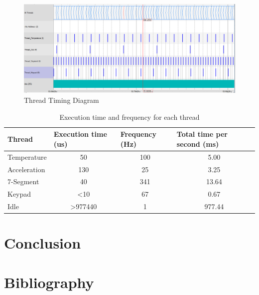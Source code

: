 ﻿\documentclass[12pt]{article}
\begin{document}
\begin{figure}[!htb]
 \centering
 \includegraphics[scale=0.50]{images/threads1.png}
 \caption{Thread Timing Diagram}
 \label{fig:threadstiming}
\end{figure}



\begin{table}[]
\centering
\caption{Execution time and frequency for each thread}
\label{Table_threads}
\begin{tabular}{|l|c|c|c|}
\hline
\textbf{Thread} & \multicolumn{1}{l|}{\textbf{Execution time (us)}} & \multicolumn{1}{l|}{\textbf{Frequency (Hz)}} & \multicolumn{1}{l|}{\textbf{Total time per second (ms)}} \\ \hline
Temperature     & 50                                           & 100                                     & 5.00                                                \\ \hline
Acceleration    & 130                                          & 25                                      & 3.25                                                \\ \hline
7-Segment       & 40                                           & 341                                     & 13.64                                               \\ \hline
Keypad          & \textless10                                  & 67                                      & 0.67                                                \\ \hline
Idle            & \textgreater977440                           & 1                                       & 977.44                                              \\ \hline
\end{tabular}
\end{table}



\section{Conclusion}

\newpage
\section{Bibliography}

 
\end{document}
